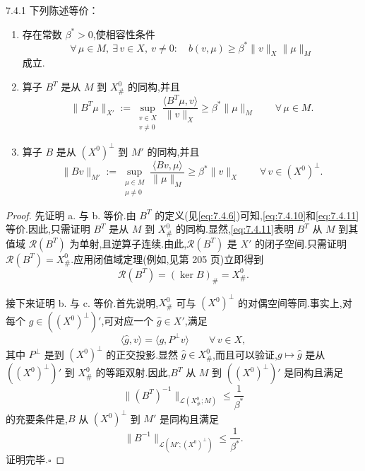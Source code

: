 \begin{proposition}[]{7.4.1}
下列陈述等价：
\begin{enumerate}[label=\alph*.]
  \item 存在常数 \(\beta^*>0\),使相容性条件
  \begin{equation}\label{eq:7.4.10}
    \forall\,\mu\in M,\ \exists\,v\in X,\ v\ne0:\quad
      b(v,\mu)\ge\beta^*\|v\|_X\|\mu\|_M
  \end{equation}
  成立.
  \item 算子 \(B^T\) 是从 \(M\) 到 \(X_\#^0\) 的同构,并且
  \begin{equation}\label{eq:7.4.11}
    \|B^T\mu\|_{X'}:=\sup_{\substack{v\in X\\v\ne0}}
       \frac{\langle B^T\mu,v\rangle}{\|v\|_X}
         \ge\beta^*\|\mu\|_M\qquad\forall\,\mu\in M.
  \end{equation}
  \item 算子 \(B\) 是从 \((X^0)^\perp\) 到 \(M'\) 的同构,并且
  \begin{equation}\label{eq:7.4.12}
    \|Bv\|_{M'}:=\sup_{\substack{\mu\in M\\\mu\ne0}}
       \frac{\langle Bv,\mu\rangle}{\|\mu\|_M}
       \ge\beta^*\|v\|_X\qquad\forall\,v\in(X^0)^\perp.
  \end{equation}
\end{enumerate}
\end{proposition}

\begin{proof}
先证明 a. 与 b. 等价.由 \(B^T\) 的定义(见\eqref{eq:7.4.6})可知,\eqref{eq:7.4.10}和\eqref{eq:7.4.11}等价.因此,只需证明 \(B^T\) 是从 \(M\) 到 \(X_\#^0\) 的同构.显然,\eqref{eq:7.4.11}表明 \(B^T\) 从 \(M\) 到其值域 \(\mathcal R(B^T)\) 为单射,且逆算子连续.由此,\(\mathcal R(B^T)\) 是 \(X'\) 的闭子空间.只需证明 \(\mathcal R(B^T)=X_\#^0\).应用闭值域定理(例如,见第 205 页)立即得到
\[
  \mathcal R(B^T)=(\ker B)_\#=X_\#^0.
\]

接下来证明 b. 与 c. 等价.首先说明,\(X_\#^0\) 可与 \((X^0)^\perp\) 的对偶空间等同.事实上,对每个 \(g\in((X^0)^\perp)'\),可对应一个 \(\widehat g\in X'\),满足
\[
  \langle\widehat g,v\rangle=\langle g,P^\perp v\rangle\qquad\forall\,v\in X,
\]
其中 \(P^\perp\) 是到 \((X^0)^\perp\) 的正交投影.显然 \(\widehat g\in X_\#^0\),而且可以验证,\(g\mapsto\widehat g\) 是从 \(((X^0)^\perp)'\) 到 \(X_\#^0\) 的等距双射.因此,\(B^T\) 从 \(M\) 到 \(((X^0)^\perp)'\) 是同构且满足
\[
  \|(B^T)^{-1}\|_{\mathcal L(X_\#^0;M)}\le\frac1{\beta^*}
\]
的充要条件是,\(B\) 从 \((X^0)^\perp\) 到 \(M'\) 是同构且满足
\[
  \|B^{-1}\|_{\mathcal L(M';(X^0)^\perp)}\le\frac1{\beta^*}.
\]
证明完毕.\hfill\(\square\)
\end{proof}

